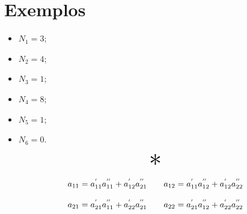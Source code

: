 \documentclass{report}
\let\oldsection\section
\renewcommand\section{\clearpage\oldsection}
\begin{document}
\section{Exemplos}

\begin{itemize}
  \item $ N_1 = 3$;
  \item $ N_2 = 4$;
  \item $ N_3 = 1$;
  \item $ N_4 = 8$;
  \item $ N_5 = 1$;
  \item $ N_6 = 0$.
\end{itemize}

\begin{center}
  \[ \scalebox{3}{$ * $} \]
\end{center}

\begin{equation}
  \label{eq:quad_cascade}
  \centering
  \begin{matrix}
    a_{11} = a^{'}_{11}a^{''}_{11} + a^{'}_{12}a^{''}_{21} & \hspace{10pt} a_{12} = a^{'}_{11}a^{''}_{12} + a^{'}_{12}a^{''}_{22} \\\\
    a_{21} = a^{'}_{21}a^{''}_{11} + a^{'}_{22}a^{''}_{21} & \hspace{10pt} a_{22} = a^{'}_{21}a^{''}_{12} + a^{'}_{22}a^{''}_{22}
  \end{matrix}
\end{equation}
\end{document}
